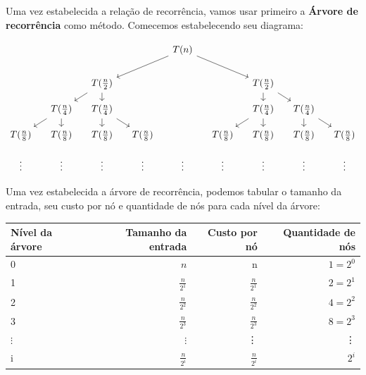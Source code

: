 Uma vez estabelecida a relação de recorrência, vamos usar primeiro a \textbf{Árvore de recorrência} como método. Comecemos estabelecendo seu diagrama:

\[\begin{tikzcd}[sep=small]
		&&&& {T(n)} \\
		\\
		&& {T(\frac{n}{2})} &&&& {T(\frac{n}{2})} \\
		& {T(\frac{n}{4})} & {T(\frac{n}{4})} &&&& {T(\frac{n}{4})} & {T(\frac{n}{4})} \\
		{T(\frac{n}{8})} & {T(\frac{n}{8})} & {T(\frac{n}{8})} & {T(\frac{n}{8})} && {T(\frac{n}{8})} & {T(\frac{n}{8})} & {T(\frac{n}{8})} & {T(\frac{n}{8})} \\
		\vdots & \vdots & \vdots & \vdots & \vdots & \vdots & \vdots & \vdots & \vdots
		\arrow[from=1-5, to=3-3]
		\arrow[from=1-5, to=3-7]
		\arrow[from=3-3, to=4-2]
		\arrow[from=3-3, to=4-3]
		\arrow[from=3-7, to=4-7]
		\arrow[from=3-7, to=4-8]
		\arrow[from=4-2, to=5-1]
		\arrow[from=4-2, to=5-2]
		\arrow[from=4-3, to=5-3]
		\arrow[from=4-3, to=5-4]
		\arrow[from=4-7, to=5-6]
		\arrow[from=4-7, to=5-7]
		\arrow[from=4-8, to=5-8]
		\arrow[from=4-8, to=5-9]
	\end{tikzcd}\]
\FloatBarrier

Uma vez estabelecida a árvore de recorrência, podemos tabular o tamanho da entrada, seu custo por nó e quantidade de nós para cada nível da árvore:


\begin{table}[h!]
	\centering
	\begin{tabular}{lrrr}
		\toprule
		Nível da árvore & Tamanho da entrada & Custo por nó    & Quantidade de nós \\
		\midrule
		0               & $n$                & n               & $1 = 2^0$         \\
		1               & $\frac{n}{2^1}$    & $\frac{n}{2^1}$ & $2 = 2^1$         \\
		2               & $\frac{n}{2^2}$    & $\frac{n}{2^2}$ & $4 = 2^2$         \\
		3               & $\frac{n}{2^3}$    & $\frac{n}{2^3}$ & $8 = 2^3$         \\
		$\vdots$        & $\vdots$           & \vdots          & \vdots            \\
		i               & $\frac{n}{2^i}$    & $\frac{n}{2^i}$ & $2^i$             \\
		\bottomrule
	\end{tabular}
\end{table}
\FloatBarrier

